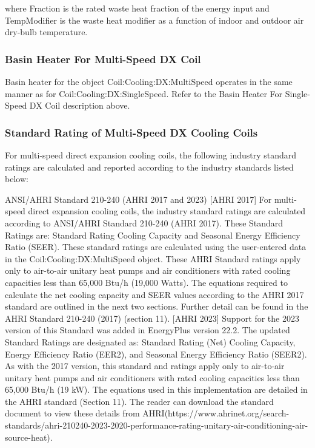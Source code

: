 where Fraction is the rated waste heat fraction of the energy input and TempModifier is the waste heat modifier as a function of indoor and outdoor air dry-bulb temperature.

\subsubsection{Basin Heater For Multi-Speed DX Coil}\label{basin-heater-for-multi-speed-dx-coil}

Basin heater for the object Coil:Cooling:DX:MultiSpeed operates in the same manner as for Coil:Cooling:DX:SingleSpeed. Refer to the Basin Heater For Single-Speed DX Coil description above.

\subsubsection{Standard Rating of Multi-Speed DX Cooling Coils}\label{standard-rating-of-multi-speed-dx-cooling-coils}

For multi-speed direct expansion cooling coils, the following industry standard ratings are calculated and reported according to the industry standards listed below:

ANSI/AHRI Standard 210-240 (AHRI 2017 and 2023)
[AHRI 2017] For multi-speed direct expansion cooling coils, the industry standard ratings are calculated according to ANSI/AHRI Standard 210-240 (AHRI 2017). These Standard Ratings are: Standard Rating Cooling Capacity and Seasonal Energy Efficiency Ratio (SEER). These standard ratings are calculated using the user-entered data in the Coil:Cooling:DX:MultiSpeed object. These AHRI Standard ratings apply only to air-to-air unitary heat pumps and air conditioners with rated cooling capacities less than 65,000 Btu/h (19,000 Watts). The equations required to calculate the net cooling capacity and SEER values according to the AHRI 2017 standard are outlined in the next two sections. Further detail can be found in the AHRI Standard 210-240 (2017) (section 11).
[AHRI 2023] Support for the 2023 version of this Standard was added in EnergyPlus version 22.2. The updated Standard Ratings are designated as: Standard Rating (Net) Cooling Capacity, Energy Efficiency Ratio (EER2), and Seasonal Energy Efficiency Ratio (SEER2). As with the 2017 version, this standard and ratings apply only to air-to-air unitary heat pumps and air conditioners with rated cooling capacities less than 65,000 Btu/h (19 kW). The equations used in this implementation are detailed in the AHRI standard (Section 11). The reader can download the standard document to view these details from AHRI(https://www.ahrinet.org/search-standards/ahri-210240-2023-2020-performance-rating-unitary-air-conditioning-air-source-heat).

